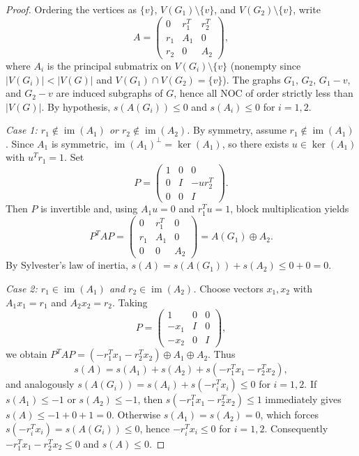 \documentclass[10pt,letterpaper]{article}
\theoremstyle{zetaplain}
\theoremstyle{zetadef}
\theoremstyle{remark}
\numberwithin{equation}{section}
\DeclareMathOperator{\im}{im}
\begin{document}
\begin{proof}
Ordering the vertices as $\{v\}$, $V(G_1) \setminus \{v\}$, and $V(G_2) \setminus \{v\}$, write
\[
  A = \begin{pmatrix}
    0 & r_1^T & r_2^T \\
    r_1 & A_1 & 0 \\
    r_2 & 0 & A_2
  \end{pmatrix},
\]
where $A_i$ is the principal submatrix on $V(G_i) \setminus \{v\}$ (nonempty since $|V(G_i)| < |V(G)|$ and $V(G_1) \cap V(G_2) = \{v\}$). The graphs $G_1$, $G_2$, $G_1 - v$, and $G_2 - v$ are induced subgraphs of $G$, hence all NOC of order strictly less than $|V(G)|$. By hypothesis, $s(A(G_i)) \le 0$ and $s(A_i) \le 0$ for $i = 1, 2$.

\emph{Case 1: $r_1 \notin \im(A_1)$ or $r_2 \notin \im(A_2)$.} By symmetry, assume $r_1 \notin \im(A_1)$. Since $A_1$ is symmetric, $\im(A_1)^\perp = \ker(A_1)$, so there exists $u \in \ker(A_1)$ with $u^T r_1 = 1$. Set
\[
  P = \begin{pmatrix}
    1 & 0 & 0 \\
    0 & I & -u r_2^T \\
    0 & 0 & I
  \end{pmatrix}.
\]
Then $P$ is invertible and, using $A_1 u = 0$ and $r_1^T u = 1$, block multiplication yields
\[
  P^T A P = \begin{pmatrix}
    0 & r_1^T & 0 \\
    r_1 & A_1 & 0 \\
    0 & 0 & A_2
  \end{pmatrix} = A(G_1) \oplus A_2.
\]
By Sylvester's law of inertia, $s(A) = s(A(G_1)) + s(A_2) \le 0 + 0 = 0$.

\emph{Case 2: $r_1 \in \im(A_1)$ and $r_2 \in \im(A_2)$.} Choose vectors $x_1, x_2$ with $A_1 x_1 = r_1$ and $A_2 x_2 = r_2$. Taking
\[
  P = \begin{pmatrix}
    1 & 0 & 0 \\
    -x_1 & I & 0 \\
    -x_2 & 0 & I
  \end{pmatrix},
\]
we obtain $P^T A P = (-r_1^T x_1 - r_2^T x_2) \oplus A_1 \oplus A_2$. Thus
\[
  s(A) = s(A_1) + s(A_2) + s(-r_1^T x_1 - r_2^T x_2),
\]
and analogously $s(A(G_i)) = s(A_i) + s(-r_i^T x_i) \le 0$ for $i = 1, 2$. If $s(A_1) \le -1$ or $s(A_2) \le -1$, then $s(-r_1^T x_1 - r_2^T x_2) \le 1$ immediately gives $s(A) \le -1 + 0 + 1 = 0$. Otherwise $s(A_1) = s(A_2) = 0$, which forces $s(-r_i^T x_i) = s(A(G_i)) \le 0$, hence $-r_i^T x_i \le 0$ for $i = 1, 2$. Consequently $-r_1^T x_1 - r_2^T x_2 \le 0$ and $s(A) \le 0$.
\end{proof}
\end{document}
